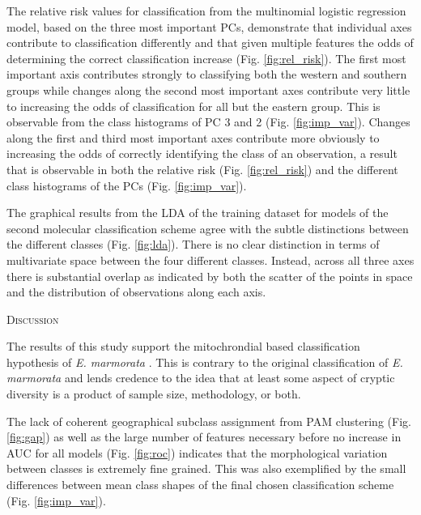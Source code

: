 \documentclass[12pt,letterpaper]{article}\usepackage{graphicx, color}
\renewcommand{\section}[1]{%
\bigskip
\begin{center}
\begin{Large}
\normalfont\scshape #1
\medskip
\end{Large}
\end{center}}
\begin{document}
The relative risk values for classification from the multinomial logistic regression model, based on the three most important PCs, demonstrate that individual axes contribute to classification differently and that given multiple features the odds of determining the correct classification increase (Fig. \ref{fig:rel_risk}). The first most important axis contributes strongly to classifying both the western and southern groups while changes along the second most important axes contribute very little to increasing the odds of classification for all but the eastern group. This is observable from the class histograms of PC 3 and 2 (Fig. \ref{fig:imp_var}). Changes along the first and third most important axes contribute more obviously to increasing the odds of correctly identifying the class of an observation, a result that is observable in both the relative risk (Fig. \ref{fig:rel_risk}) and the different class histograms of the PCs (Fig. \ref{fig:imp_var}).

The graphical results from the LDA of the training dataset for models of the second molecular classification scheme agree with the subtle distinctions between the different classes (Fig. \ref{fig:lda}). There is no clear distinction in terms of multivariate space between the four different classes. Instead, across all three axes there is substantial overlap as indicated by both the scatter of the points in space and the distribution of observations along each axis.

\section{Discussion}
The results of this study support the mitochrondial based classification hypothesis of \textit{E. marmorata} \citep{Spinks2005,Spinks2010}. This is contrary to the original classification of \textit{E. marmorata} \citep{Seeliger1945,Holland1992} and lends credence to the idea that at least some aspect of cryptic diversity is a product of sample size, methodology, or both.


The lack of coherent geographical subclass assignment from PAM clustering (Fig. \ref{fig:gap}) as well as the large number of features necessary before no increase in AUC for all models (Fig. \ref{fig:roc}) indicates that the morphological variation between classes is extremely fine grained. This was also exemplified by the small differences between mean class shapes of the final chosen classification scheme (Fig. \ref{fig:imp_var}).
\end{document}
